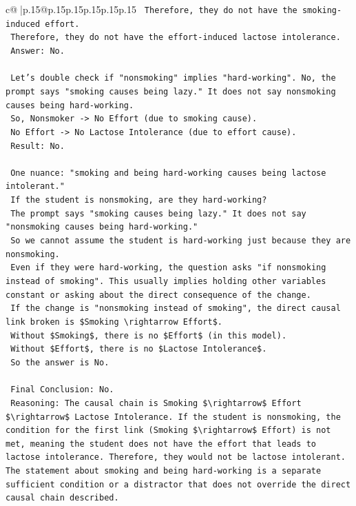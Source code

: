 \documentclass{article}
\begin{document}
{\begin{supertabular}{c@{$\;$}|p{.15\linewidth}@{}p{.15\linewidth}p{.15\linewidth}p{.15\linewidth}p{.15\linewidth}p{.15\linewidth}}
{{{\texttt{    Therefore, they do not have the smoking{-}induced effort.} \\
\texttt{    Therefore, they do not have the effort{-}induced lactose intolerance.} \\
\texttt{    Answer: No.} \\
\\ 
\texttt{    Let's double check if "nonsmoking" implies "hard{-}working". No, the prompt says "smoking causes being lazy." It does not say nonsmoking causes being hard{-}working.} \\
\texttt{    So, Nonsmoker {-}> No Effort (due to smoking cause).} \\
\texttt{    No Effort {-}> No Lactose Intolerance (due to effort cause).} \\
\texttt{    Result: No.} \\
\\ 
\texttt{    One nuance: "smoking and being hard{-}working causes being lactose intolerant."} \\
\texttt{    If the student is nonsmoking, are they hard{-}working?} \\
\texttt{    The prompt says "smoking causes being lazy." It does not say "nonsmoking causes being hard{-}working."} \\
\texttt{    So we cannot assume the student is hard{-}working just because they are nonsmoking.} \\
\texttt{    Even if they were hard{-}working, the question asks "if nonsmoking instead of smoking". This usually implies holding other variables constant or asking about the direct consequence of the change.} \\
\texttt{    If the change is "nonsmoking instead of smoking", the direct causal link broken is \$Smoking \textbackslash{}rightarrow Effort\$.} \\
\texttt{    Without \$Smoking\$, there is no \$Effort\$ (in this model).} \\
\texttt{    Without \$Effort\$, there is no \$Lactose Intolerance\$.} \\
\texttt{    So the answer is No.} \\
\\ 
\texttt{    Final Conclusion: No.} \\
\texttt{    Reasoning: The causal chain is Smoking \$\textbackslash{}rightarrow\$ Effort \$\textbackslash{}rightarrow\$ Lactose Intolerance. If the student is nonsmoking, the condition for the first link (Smoking \$\textbackslash{}rightarrow\$ Effort) is not met, meaning the student does not have the effort that leads to lactose intolerance. Therefore, they would not be lactose intolerant. The statement about smoking and being hard{-}working is a separate sufficient condition or a distractor that does not override the direct causal chain described.} \\
}}}
\end{supertabular}}
\end{document}
